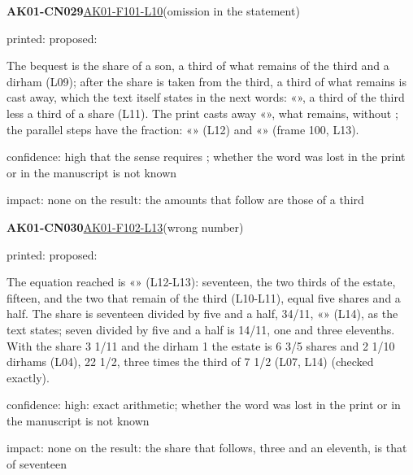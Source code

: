 \documentclass[11pt]{article}
\begin{document}
\noindent\textbf{AK01-CN029}\enspace\hyperlink{AK01-F101-L10}{AK01-F101-L10}\enspace(omission in the statement)\par\noindent printed: \enspace proposed: \par\noindent The bequest is the share of a son, a third of what remains of the third and a dirham (L09); after the share is taken from the third, a third of what remains is cast away, which the text itself states in the next words: «», a third of the third less a third of a share (L11). The print casts away «», what remains, without ; the parallel steps have the fraction: «» (L12) and «» (frame 100, L13).\par\noindent confidence: high that the sense requires ; whether the word was lost in the print or in the manuscript is not known\par\noindent impact: none on the result: the amounts that follow are those of a third\par\medskip
\noindent\textbf{AK01-CN030}\enspace\hyperlink{AK01-F102-L13}{AK01-F102-L13}\enspace(wrong number)\par\noindent printed: \enspace proposed: \par\noindent The equation reached is «» (L12-L13): seventeen, the two thirds of the estate, fifteen, and the two that remain of the third (L10-L11), equal five shares and a half. The share is seventeen divided by five and a half, 34/11, «» (L14), as the text states; seven divided by five and a half is 14/11, one and three elevenths. With the share 3 1/11 and the dirham 1 the estate is 6 3/5 shares and 2 1/10 dirhams (L04), 22 1/2, three times the third of 7 1/2 (L07, L14) (checked exactly).\par\noindent confidence: high: exact arithmetic; whether the word was lost in the print or in the manuscript is not known\par\noindent impact: none on the result: the share that follows, three and an eleventh, is that of seventeen\par\medskip
\end{document}
